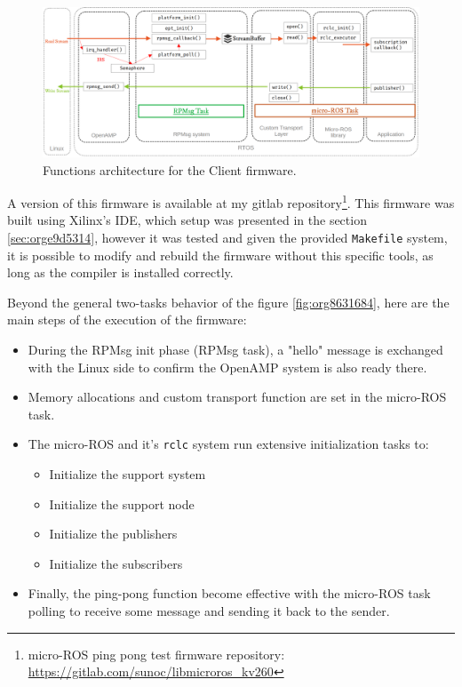 \documentclass[10pt]{article}
\begin{document}
\begin{figure}[htbp]
\centering
\includegraphics[width=.9\textwidth]{./img/client_arch.png}
\caption{\label{fig:orga9fc240}Functions architecture for the Client firmware.}
\end{figure}

A version of this firmware is available at my gitlab repository\footnote{micro-ROS ping pong test firmware repository: \url{https://gitlab.com/sunoc/libmicroros\_kv260}}. This firmware was built using
Xilinx's IDE, which setup was presented in the section \ref{sec:orge9d5314}, however it was tested
and given the provided \texttt{Makefile} system, it is possible to modify and rebuild the firmware
without this specific tools, as long as the compiler is installed correctly.

Beyond the general two-tasks behavior of the figure \ref{fig:org8631684}, here are the main steps
of the execution of the firmware:
\begin{itemize}
\item During the RPMsg init phase (RPMsg task), a "hello" message is exchanged with the Linux side
to confirm the OpenAMP system is also ready there.
\item Memory allocations and custom transport function are set in the micro-ROS task.
\item The micro-ROS and it's \texttt{rclc} system run extensive initialization tasks to:
\begin{itemize}
\item Initialize the support system
\item Initialize the support node
\item Initialize the publishers
\item Initialize the subscribers
\end{itemize}
\item Finally, the ping-pong function become effective with the micro-ROS task
polling to receive some message and sending it back to the sender.
\end{itemize}
\end{document}
